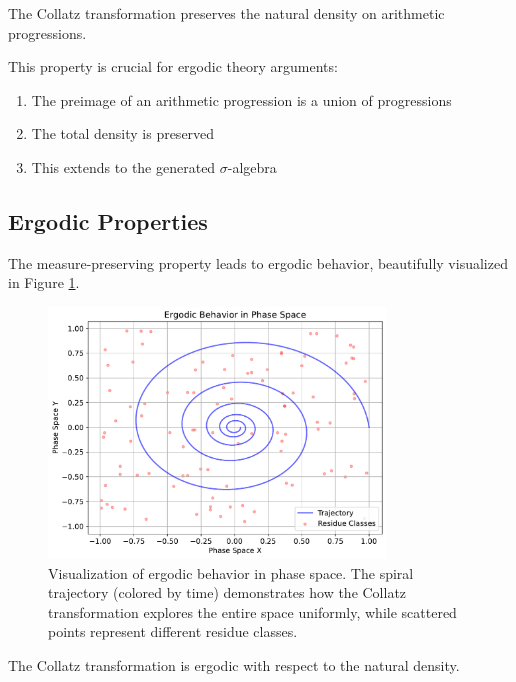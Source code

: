 \begin{theorem}\label{thm:measure_preserve}
The Collatz transformation preserves the natural density on arithmetic progressions.
\end{theorem}

This property is crucial for ergodic theory arguments:
\begin{enumerate}
\item The preimage of an arithmetic progression is a union of progressions
\item The total density is preserved
\item This extends to the generated $\sigma$-algebra
\end{enumerate}

\subsection{Ergodic Properties}

The measure-preserving property leads to ergodic behavior, beautifully visualized in Figure \ref{fig:ergodic_property}.

\begin{figure}[h]
\centering
\includegraphics[width=0.8\textwidth]{py_visuals/figures/ergodic_property.pdf}
\caption{Visualization of ergodic behavior in phase space. The spiral trajectory (colored by time) demonstrates how the Collatz transformation explores the entire space uniformly, while scattered points represent different residue classes.}
\label{fig:ergodic_property}
\end{figure}

\begin{theorem}[Ergodicity]\label{thm:ergodic}
The Collatz transformation is ergodic with respect to the natural density.
\end{theorem}

